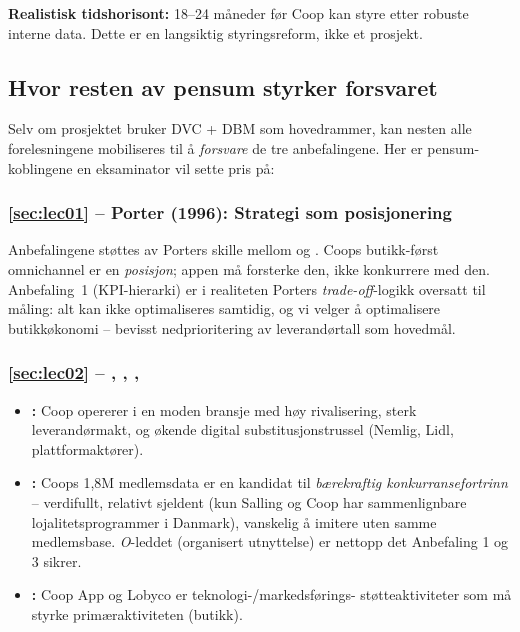 \textbf{Realistisk tidshorisont:} 18--24 måneder før Coop kan styre etter
robuste interne data. Dette er en langsiktig styringsreform, ikke et
prosjekt.

\subsection{Hvor resten av pensum styrker forsvaret}

Selv om prosjektet bruker DVC + DBM som hovedrammer, kan nesten alle
forelesningene mobiliseres til å \emph{forsvare} de tre anbefalingene. Her
er pensum-koblingene en eksaminator vil sette pris på:

\subsubsection*{\autoref{sec:lec01} -- Porter (1996): Strategi som
posisjonering}
Anbefalingene støttes av Porters skille mellom  og
. Coops butikk-først omnichannel er en
\emph{posisjon}; appen må forsterke den, ikke konkurrere med den.
Anbefaling~1 (KPI-hierarki) er i realiteten Porters \emph{trade-off}-logikk
oversatt til måling: alt kan ikke optimaliseres samtidig, og vi velger å
optimalisere butikkøkonomi -- bevisst nedprioritering av leverandørtall som
hovedmål.

\subsubsection*{\autoref{sec:lec02} -- , , , }
\begin{itemize}
  \item \textbf{:} Coop opererer i en moden bransje med høy
    rivalisering, sterk leverandørmakt, og økende digital substitusjonstrussel
    (Nemlig, Lidl, plattformaktører).
  \item \textbf{:} Coops 1{,}8M medlemsdata er en kandidat til
    \emph{bærekraftig konkurransefortrinn} -- verdifullt, relativt sjeldent
    (kun Salling og Coop har sammenlignbare lojalitetsprogrammer i Danmark),
    vanskelig å imitere uten samme medlemsbase. \emph{O}-leddet
    (organisert utnyttelse) er nettopp det Anbefaling 1 og 3 sikrer.
  \item \textbf{:} Coop App og Lobyco er teknologi-/markedsførings-
    støtteaktiviteter som må styrke primæraktiviteten (butikk).
\end{itemize}

